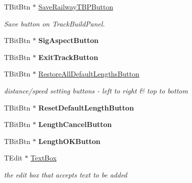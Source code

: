 \begin{DoxyCompactItemize}
\mbox{\label{class_t_interface_a35180ffd0cb48764968472d8440e5e8c}} 
T\+Bit\+Btn $\ast$ \mbox{\hyperlink{class_t_interface_a35180ffd0cb48764968472d8440e5e8c}{Save\+Railway\+T\+B\+P\+Button}}
\begin{DoxyCompactList}\small\item\em Save button on Track\+Build\+Panel. \end{DoxyCompactList}\item 
\mbox{\label{class_t_interface_a324a38cd651966659418115d929cffa3}} 
T\+Bit\+Btn $\ast$ {\bfseries Sig\+Aspect\+Button}
\item 
\mbox{\label{class_t_interface_a82eae7dcf4d4e034ab28c9c8bf9b7ab6}} 
T\+Bit\+Btn $\ast$ {\bfseries Exit\+Track\+Button}
\item 
\mbox{\label{class_t_interface_afd2db76b8ad01467fe391b533069aea1}} 
T\+Bit\+Btn $\ast$ \mbox{\hyperlink{class_t_interface_afd2db76b8ad01467fe391b533069aea1}{Restore\+All\+Default\+Lengths\+Button}}
\begin{DoxyCompactList}\small\item\em distance/speed setting buttons -\/ left to right \& top to bottom \end{DoxyCompactList}\item 
\mbox{\label{class_t_interface_aae04f0656f715e7ddb86f676caf505a6}} 
T\+Bit\+Btn $\ast$ {\bfseries Reset\+Default\+Length\+Button}
\item 
\mbox{\label{class_t_interface_afeadfc0f77796b75186a1647496dc0ac}} 
T\+Bit\+Btn $\ast$ {\bfseries Length\+Cancel\+Button}
\item 
\mbox{\label{class_t_interface_ad73c4b5aefb218b1b56a35e8955533b0}} 
T\+Bit\+Btn $\ast$ {\bfseries Length\+O\+K\+Button}
\item 
\mbox{\label{class_t_interface_a0f8c2ed3f742ce9640f52fe08fb33bfd}} 
T\+Edit $\ast$ \mbox{\hyperlink{class_t_interface_a0f8c2ed3f742ce9640f52fe08fb33bfd}{Text\+Box}}
\begin{DoxyCompactList}\small\item\em the edit box that accepts text to be added \end{DoxyCompactList}\item 

\end{DoxyCompactItemize}

